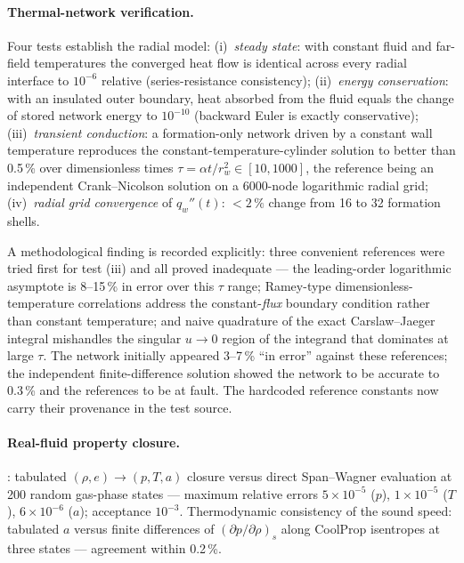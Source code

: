 \documentclass[11pt]{article}
\begin{document}
\paragraph{Thermal-network verification.} Four tests establish the
radial model: (i)~\emph{steady state}: with constant fluid and
far-field temperatures the converged heat flow is identical across
every radial interface to $10^{-6}$ relative (series-resistance
consistency); (ii)~\emph{energy conservation}: with an insulated
outer boundary, heat absorbed from the fluid equals the change of
stored network energy to $10^{-10}$ (backward Euler is exactly
conservative); (iii)~\emph{transient conduction}: a formation-only
network driven by a constant wall temperature reproduces the
constant-temperature-cylinder solution to better than
0.5\,\% over dimensionless times
$\tau = \alpha t/r_w^2 \in [10, 1000]$, the reference being an
independent Crank--Nicolson solution on a 6000-node logarithmic
radial grid; (iv)~\emph{radial grid convergence} of $q_w''(t)$:
$<2\,\%$ change from 16 to 32 formation shells.
\label{sec:vv-thermal}

A methodological finding is recorded explicitly: three convenient
references were tried first for test (iii) and all proved inadequate
--- the leading-order logarithmic asymptote is 8--15\,\% in error over
this $\tau$ range; Ramey-type dimensionless-temperature correlations
\citep{ramey1962,hasan1991} address the constant-\emph{flux} boundary
condition rather than constant temperature; and naive quadrature of
the exact Carslaw--Jaeger integral \citep{carslaw1959} mishandles the
singular $u \to 0$ region of the integrand that dominates at large
$\tau$. The network initially appeared 3--7\,\% ``in error'' against
these references; the independent finite-difference solution showed
the network to be accurate to 0.3\,\% and the references to be at
fault. The hardcoded reference constants now carry their provenance
in the test source.

\paragraph{Real-fluid property closure.} : tabulated
$(\rho,e)\to(p,T,a)$ closure versus direct Span--Wagner evaluation at
200 random gas-phase states --- maximum relative errors
$5\times10^{-5}$ ($p$), $1\times10^{-5}$ ($T$), $6\times10^{-6}$
($a$); acceptance $10^{-3}$. Thermodynamic consistency of the sound
speed: tabulated $a$ versus finite differences of $(\partial
p/\partial\rho)_s$ along CoolProp isentropes at three states ---
agreement within 0.2\,\%.
\end{document}
